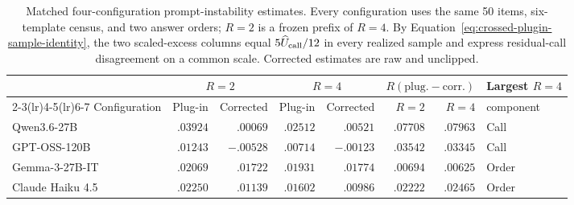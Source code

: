 \begin{table}[t]
\centering
\setlength{\tabcolsep}{3.8pt}
\begin{tabular}{lrrrrrrl}
\toprule
& \multicolumn{2}{c}{\(R=2\)}
& \multicolumn{2}{c}{\(R=4\)}
& \multicolumn{2}{c}{\(R(\mathrm{plug.}-\mathrm{corr.})\)}
& Largest \(R=4\) \\
\cmidrule(lr){2-3}\cmidrule(lr){4-5}\cmidrule(lr){6-7}
Configuration & Plug-in & Corrected & Plug-in & Corrected &
\(R=2\) & \(R=4\) & component \\
\midrule
Qwen3.6-27B & $.03924$ & $.00069$ & $.02512$ & $.00521$ & $.07708$ & $.07963$ & Call \\
GPT-OSS-120B & $.01243$ & $-.00528$ & $.00714$ & $-.00123$ & $.03542$ & $.03345$ & Call \\
Gemma-3-27B-IT & $.02069$ & $.01722$ & $.01931$ & $.01774$ & $.00694$ & $.00625$ & Order \\
Claude Haiku 4.5 & $.02250$ & $.01139$ & $.01602$ & $.00986$ & $.02222$ & $.02465$ & Order \\
\bottomrule
\end{tabular}
\caption{Matched four-configuration prompt-instability estimates. Every
configuration uses the same 50 items, six-template census, and two answer
orders; \(R=2\) is a frozen prefix of \(R=4\). By
Equation~\eqref{eq:crossed-plugin-sample-identity}, the two scaled-excess
columns equal \(5\widehat U_{\rm call}/12\) in every realized sample and
express residual-call disagreement on a common scale. Corrected estimates are
raw and unclipped.}
\label{tab:cross_model_summary}
\end{table}
